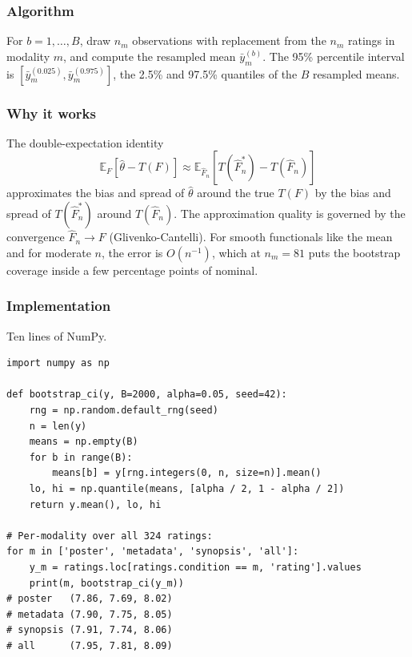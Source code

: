 \documentclass{article}
\begin{document}
\subsubsection*{Algorithm}

For $b = 1, \ldots, B$, draw $n_m$ observations with replacement from the $n_m$ ratings in modality $m$, and compute the resampled mean $\bar y_m^{(b)}$. The 95\% percentile interval is $[\bar y_m^{(0.025)}, \bar y_m^{(0.975)}]$, the 2.5\% and 97.5\% quantiles of the $B$ resampled means.

\subsubsection*{Why it works}

The double-expectation identity
\begin{equation}
\mathbb{E}_F[\hat\theta - T(F)] \approx \mathbb{E}_{\hat F_n}[T(\hat F_n^\ast) - T(\hat F_n)]
\label{eq:bootstrap-principle}
\end{equation}
approximates the bias and spread of $\hat\theta$ around the true $T(F)$ by the bias and spread of $T(\hat F_n^\ast)$ around $T(\hat F_n)$. The approximation quality is governed by the convergence $\hat F_n \to F$ (Glivenko-Cantelli). For smooth functionals like the mean and for moderate $n$, the error is $O(n^{-1})$, which at $n_m = 81$ puts the bootstrap coverage inside a few percentage points of nominal.

\subsubsection*{Implementation}

Ten lines of NumPy.

\begin{lstlisting}[caption={Percentile bootstrap for the per-modality rating mean.}]
import numpy as np

def bootstrap_ci(y, B=2000, alpha=0.05, seed=42):
    rng = np.random.default_rng(seed)
    n = len(y)
    means = np.empty(B)
    for b in range(B):
        means[b] = y[rng.integers(0, n, size=n)].mean()
    lo, hi = np.quantile(means, [alpha / 2, 1 - alpha / 2])
    return y.mean(), lo, hi

# Per-modality over all 324 ratings:
for m in ['poster', 'metadata', 'synopsis', 'all']:
    y_m = ratings.loc[ratings.condition == m, 'rating'].values
    print(m, bootstrap_ci(y_m))
# poster   (7.86, 7.69, 8.02)
# metadata (7.90, 7.75, 8.05)
# synopsis (7.91, 7.74, 8.06)
# all      (7.95, 7.81, 8.09)
\end{lstlisting}
\end{document}
